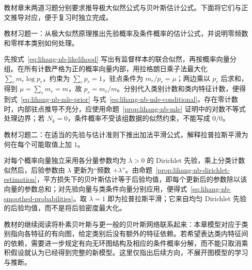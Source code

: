 教材章末两道习题分别要求推导极大似然公式与贝叶斯估计公式。下面将它们与正文推导对应，便于复习时独立完成。

\begin{example}
\label{ex:lihang-nb-exercise-mle}
教材习题一：从极大似然原理推出先验概率及条件概率的估计公式，并说明零频数和零样本类别如何处理。
\end{example}

\begin{solve}
先按式~\eqref{eq:lihang-nb-likelihood} 写出有监督样本的联合似然，再按概率向量分组。在所有计数严格为正的概率向量内部，用拉格朗日乘子法最大化 $\sum_r m_r\log p_r$，约束为 $\sum_r p_r=1$，驻点条件为 $m_r/p_r=\mu$；两边乘以 $p_r$ 后求和，得到 $\mu=\sum_r m_r=m$，故 $p_r=m_r/m$。分别代入类别计数和类内特征计数，便得到式~\eqref{eq:lihang-nb-mle-prior} 与式~\eqref{eq:lihang-nb-mle-conditional}。存在零计数时，内部驻点推导不充分，应使用命题~\ref{prop:lihang-nb-mle} 证明中的对数不等式处理边界；若 $N_k=0$，条件概率不受该组数据的似然约束，不能写成 $0/0$。
\end{solve}

\begin{example}
\label{ex:lihang-nb-exercise-bayes}
教材习题二：在适当的先验与估计准则下推出加法平滑公式，解释拉普拉斯平滑为何在每个可能取值上加 $1$。
\end{example}

\begin{solve}
对每个概率向量独立采用各分量参数均为 $\lambda>0$ 的 Dirichlet 先验，乘上分类计数似然后，后验参数由 $\lambda$ 更新为“频数 $+\lambda$”。由命题~\ref{prop:lihang-nb-dirichlet-estimation}，平方损失下的贝叶斯估计等于后验均值，即每个更新后的参数除以该向量的参数总和；对先验向量与类条件向量分别应用，便得式~\eqref{eq:lihang-nb-smoothed-probabilities}。取 $\lambda=1$ 即为拉普拉斯平滑；它来自均匀 Dirichlet 先验的后验均值，而不是将后验密度最大化。
\end{solve}

教材的继续阅读将朴素贝叶斯与更一般的贝叶斯网络联系起来：本章模型对应于类别指向各特征的有向图，给定类别后没有额外的特征依赖。若希望表达类内特征间的依赖，需要进一步规定有向无环图结构及相应的条件概率分解，而不能只取消乘积假设就认为已经得到完整的新模型。这里仅指出后续方向，不展开图模型的学习与推断。





